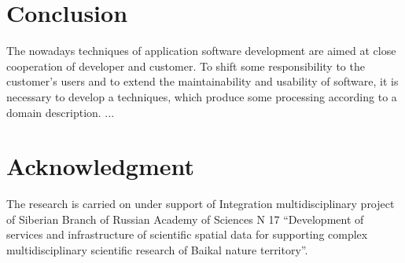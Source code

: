 \documentclass[conference]{IEEEtran}
\begin{document}


\section{Conclusion}

The nowadays techniques of application software development are aimed at close cooperation of developer and customer.  To shift some responsibility to the customer's users and to extend the maintainability and usability of software, it is necessary to develop a techniques, which produce some processing according to a domain description.  ...



\section*{Acknowledgment}
The research is carried on under support of Integration multidisciplinary project of Siberian Branch of Russian Academy of Sciences N 17 “Development of services and infrastructure of scientific spatial data for supporting complex multidisciplinary scientific research of Baikal nature territory”.



\end{document}
